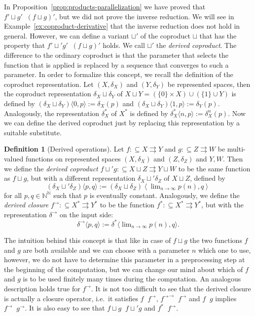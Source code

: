 \documentclass[a4paper]{amsart}
\def\IN{{\mathbb{N}}}
\def\In{\subseteq}
\def\mto{\rightrightarrows}
\def\Baire{{\IN^\IN}}
\def\leqSW{\mathop{\leq_{\mathrm{sW}}}}
\def\equivSW{\mathop{\equiv_{\mathrm{sW}}}}
\theoremstyle{definition}
\newtheorem{definition}[theorem]{Definition}
\begin{document}
In Proposition~\ref{prop:products-parallelization} we have proved that $f'\sqcup g'\leqSW(f\sqcup g)'$,
but we did not prove the inverse reduction. We will see in Example~\ref{ex:coproduct-derivative} that the
inverse reduction does not hold in general.
 However, we can define a variant $\sqcup'$ of the coproduct $\sqcup$
that has the property that $f'\sqcup' g'\equivSW(f\sqcup g)'$ holds.
We call $\sqcup'$ the {\em derived coproduct}. The difference to the ordinary coproduct
is that the parameter that selects the function that is applied is replaced by a sequence
that converges to such a parameter.
In order to formalize this concept, we recall the definition of the coproduct representation.
Let $(X,\delta_X)$ and $(Y,\delta_Y)$ be represented spaces, then the coproduct representation
$\delta_X\sqcup\delta_Y$ of $X\sqcup Y=(\{0\}\times X)\cup(\{1\}\cup Y)$ is defined by
$(\delta_X\sqcup\delta_Y)\langle 0,p\rangle:=\delta_X(p)$ and $(\delta_X\sqcup\delta_Y)\langle 1,p\rangle:=\delta_Y(p)$.
Analogously, the representation $\delta_X^*$ of $X^*$ is defined by $\delta_X^*\langle n,p\rangle:=\delta_X^n(p)$.
Now we can define the derived coproduct just by replacing this representation by a suitable substitute.

\begin{definition}[Derived operations]
Let $f:\In X\mto Y$ and $g:\In Z\mto W$ be multi-valued functions on represented 
spaces $(X,\delta_X)$ and $(Z,\delta_Z)$ and $Y,W$. 
Then we define the {\em derived coproduct} $f\sqcup'g:\In X\sqcup Z\mto Y\sqcup W$
to be the same function as $f\sqcup g$, but with a different representation 
$\delta_X\sqcup'\delta_Z$ of $X\sqcup Z$, defined by 
\[(\delta_X\sqcup'\delta_Z)\langle p,q\rangle:=(\delta_X\sqcup\delta_Z)\left\langle\lim\nolimits_{n\to\infty}p(n),q\right\rangle\]
for all $p,q\in\Baire$ such that $p$ is eventually constant. 
Analogously, we define the {\em derived closure} $f^\to:\In X^*\mto Y^*$ to be the function
$f^*:\In X^*\mto Y^*$, but with the representation $\delta^\to$ on the input side:
\[\delta^\to\langle p,q\rangle:=\delta^*\langle\lim\nolimits_{n\to\infty}p(n),q\rangle.\]
\end{definition}

The intuition behind this concept is that like in case of $f\sqcup g$ the two functions $f$ and $g$
are both available and we can choose with a parameter $n$ which one to use, however, 
we do not have to determine this parameter in a preprocessing step at the beginning of the computation,
but we can change our mind about which of $f$ and $g$ is to be used finitely many times during the computation.
An analogous description holds true for $f^\to$.
It is not too difficult to see that the derived closure is actually a closure operator,
i.e.\ it satisfies $f\leqSW f^\to$, ${f^\to}^\to\leqSW f^\to$ and $f\leqSW g$ implies $f^\to\leqSW g^\to$.
It is also easy to see that $f\sqcup g\leqSW f\sqcup' g$ and $f^*\leqSW f^\to$. 
\end{document}
